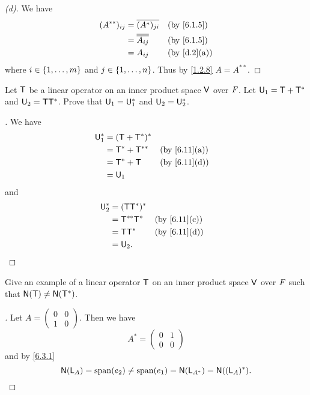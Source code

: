 \begin{proof}[(d)]
  We have
  \begin{align*}
    (A^{**})_{i j} & = \conj{(A^*)_{j i}}    &  & \text{(by \cref{6.1.5})}  \\
                   & = \conj{\conj{A_{i j}}} &  & \text{(by \cref{6.1.5})}  \\
                   & = A_{i j}               &  & \text{(by \cref{d.2}(a))}
  \end{align*}
  where \(i \in \left\lbrace1, \dots, m\right\rbrace\) and \(j \in \left\lbrace1, \dots, n\right\rbrace\).
  Thus by \cref{1.2.8} \(A = A^{**}\).
\end{proof}

\begin{ex}\label{ex:6.3.6}
  Let \(\mathsf{T}\) be a linear operator on an inner product space \(\mathsf{V}\) over \(\mathit{F}\).
  Let \(\mathsf{U}_1 = \mathsf{T} + \mathsf{T}^*\) and \(\mathsf{U}_2 = \mathsf{T} \mathsf{T}^*\).
  Prove that \(\mathsf{U}_1 = \mathsf{U}_1^*\) and \(\mathsf{U}_2 = \mathsf{U}_2^*\).
\end{ex}

\begin{proof}[]
  We have
  \begin{align*}
    \U_1^* & = (\T + \T^*)^*                                  \\
           & = \T^* + \T^{**} &  & \text{(by \cref{6.11}(a))} \\
           & = \T^* + \T      &  & \text{(by \cref{6.11}(d))} \\
           & = \U_1
  \end{align*}
  and
  \begin{align*}
    \U_2^* & = (\T \T^*)^*                                  \\
           & = \T^{**} \T^* &  & \text{(by \cref{6.11}(c))} \\
           & = \T \T^*      &  & \text{(by \cref{6.11}(d))} \\
           & = \U_2.
  \end{align*}
\end{proof}

\begin{ex}\label{ex:6.3.7}
  Give an example of a linear operator \(\mathsf{T}\) on an inner product space \(\mathsf{V}\) over \(\mathit{F}\) such that \(\ns{\T} \neq \ns{\T^*}\).
\end{ex}

\begin{proof}[]
  Let \(A = \begin{pmatrix}
    0 & 0 \\
    1 & 0
  \end{pmatrix}\).
  Then we have
  \[
    A^* = \begin{pmatrix}
      0 & 1 \\
      0 & 0
    \end{pmatrix}
  \]
  and by \cref{6.3.1}
  \[
    \ns{\L_A} = \spn{e_2} \neq \spn{e_1} = \ns{\L_{A^*}} = \ns{(\L_A)^*}.
  \]
\end{proof}

